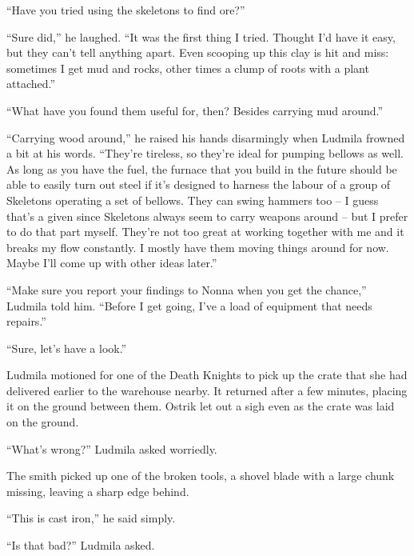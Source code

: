  

“Have you tried using the skeletons to find ore?”

 

“Sure did,” he laughed. “It was the first thing I tried. Thought I’d have it easy, but they can’t tell anything apart. Even scooping up this clay is hit and miss: sometimes I get mud and rocks, other times a clump of roots with a plant attached.”

 

“What have you found them useful for, then? Besides carrying mud around.”

 

“Carrying wood around,” he raised his hands disarmingly when Ludmila frowned a bit at his words. “They’re tireless, so they’re ideal for pumping bellows as well. As long as you have the fuel, the furnace that you build in the future should be able to easily turn out steel if it’s designed to harness the labour of a group of Skeletons operating a set of bellows. They can swing hammers too – I guess that’s a given since Skeletons always seem to carry weapons around – but I prefer to do that part myself. They’re not too great at working together with me and it breaks my flow constantly. I mostly have them moving things around for now. Maybe I’ll come up with other ideas later.”

 

“Make sure you report your findings to Nonna when you get the chance,” Ludmila told him. “Before I get going, I’ve a load of equipment that needs repairs.”

 

“Sure, let’s have a look.”

 

Ludmila motioned for one of the Death Knights to pick up the crate that she had delivered earlier to the warehouse nearby. It returned after a few minutes, placing it on the ground between them. Ostrik let out a sigh even as the crate was laid on the ground.

 

“What’s wrong?” Ludmila asked worriedly.

 

The smith picked up one of the broken tools, a shovel blade with a large chunk missing, leaving a sharp edge behind.

 

“This is cast iron,” he said simply.

 

“Is that bad?” Ludmila asked.

